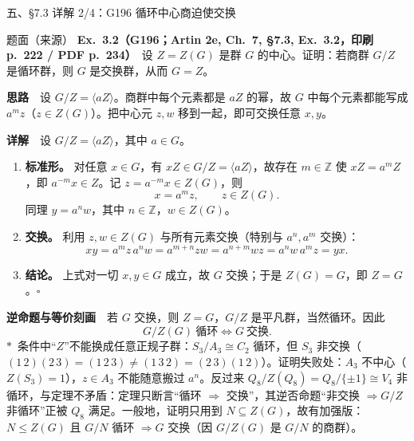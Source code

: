 \documentclass[aspectratio=169,10pt,fontset=none]{ctexbeamer}
\newcommand{\ex}[1]{\textcolor{accent}{\footnotesize\bfseries #1}}
\newcommand{\key}[1]{\textcolor{ink}{\bfseries #1}}
\newcommand{\starpt}{\textcolor{accent}{\bfseries$\ast$}}
\begin{document}
\begin{frame}[t]{五、\S7.3 详解 2/4：G196 循环中心商迫使交换}
\label{ex:G196}
\begin{block}{\footnotesize 题面（来源）}
\scriptsize
\textbf{Ex.~3.2（\ex{G196}；Artin 2e, Ch.~7, \S7.3, Ex.~3.2，印刷 p.~222 / PDF p.~234）}\ 
设 $Z=Z(G)$ 是群 $G$ 的中心。证明：若商群 $G/Z$ 是循环群，则 $G$ 是交换群，从而 $G=Z$。
\end{block}
{\footnotesize\key{思路}\ \ 设 $G/Z=\langle aZ\rangle$。商群中每个元素都是 $aZ$ 的幂，故 $G$ 中每个元素都能写成 $a^m z$（$z\in Z(G)$）。把中心元 $z,w$ 移到一起，即可交换任意 $x,y$。\par}
{\footnotesize\key{详解}\ \ 设 $G/Z=\langle aZ\rangle$，其中 $a\in G$。\par}
\begin{enumerate}\setlength{\itemsep}{0.5pt}
\scriptsize
\item \textbf{标准形。} 对任意 $x\in G$，有 $xZ\in G/Z=\langle aZ\rangle$，故存在 $m\in\mathbb Z$ 使 $xZ=a^mZ$，即 $a^{-m}x\in Z$。记 $z=a^{-m}x\in Z(G)$，则
\[ x=a^m z,\qquad z\in Z(G). \]
同理 $y=a^n w$，其中 $n\in\mathbb Z$，$w\in Z(G)$。
\item \textbf{交换。} 利用 $z,w\in Z(G)$ 与所有元素交换（特别与 $a^n,a^m$ 交换）：
\[ xy=a^m z\,a^n w=a^{m+n}zw=a^{n+m}wz=a^n w\,a^m z=yx. \]
\item \textbf{结论。} 上式对一切 $x,y\in G$ 成立，故 $G$ 交换；于是 $Z(G)=G$，即 $Z=G$。$\square$
\end{enumerate}
{\footnotesize\key{逆命题与等价刻画}\ \ 若 $G$ 交换，则 $Z=G$，$G/Z$ 是平凡群，当然循环。因此
\[ G/Z(G)\ \text{循环}\iff G\ \text{交换}. \]
{\color{ink!80}\starpt}\ 条件中“$Z$”不能换成任意正规子群：$S_3/A_3\cong C_2$ 循环，但 $S_3$ 非交换（$(1\,2)(2\,3)=(1\,2\,3)\neq(1\,3\,2)=(2\,3)(1\,2)$）。证明失败处：$A_3$ 不中心（$Z(S_3)=1$），$z\in A_3$ 不能随意搬过 $a^n$。反过来 $Q_8/Z(Q_8)=Q_8/\{\pm1\}\cong V_4$ 非循环，与定理不矛盾：定理只断言“循环 $\Rightarrow$ 交换”，其逆否命题“非交换 $\Rightarrow G/Z$ 非循环”正被 $Q_8$ 满足。一般地，证明只用到 $N\subseteq Z(G)$，故有加强版：$N\le Z(G)$ 且 $G/N$ 循环 $\Rightarrow G$ 交换（因 $G/Z(G)$ 是 $G/N$ 的商群）。\par}
\end{frame}
\end{document}
